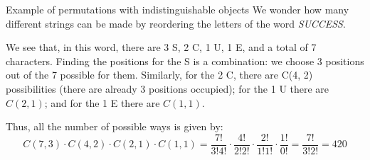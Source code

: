 \documentclass[a4paper]{article}
\begin{document}
\begin{parag}{Example of permutations with indistinguishable objects}
    We wonder how many different strings can be made by reordering the letters of the word \textit{SUCCESS}.

    We see that, in this word, there are 3 S, 2 C, 1 U, 1 E, and a total of 7 characters. Finding the positions for the S is a combination: we choose 3 positions out of the 7 possible for them. Similarly, for the 2 C, there are C(4, 2) possibilities (there are already 3 positions occupied); for the 1 U there are $C\left(2, 1\right)$; and for the 1 E there are $C\left(1, 1\right)$.

    Thus, all the number of possible ways is given by: 
    \[C\left(7,3\right)\cdot C\left(4,2\right)\cdot C\left(2,1\right)\cdot C\left(1,1\right) = \frac{7!}{3!4!} \cdot \frac{4!}{2!2!} \cdot \frac{2!}{1!1!} \cdot \frac{1!}{0!} = \frac{7!}{3!2!} = 420\]

    
\end{parag}
\end{document}
